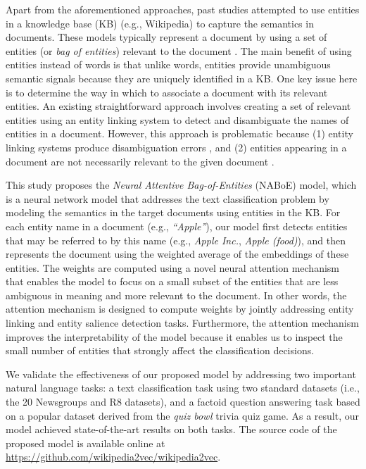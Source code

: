 \documentclass[11pt,a4paper]{article}
\begin{document}
    Apart from the aforementioned approaches, past studies attempted to use entities in a knowledge base (KB) (e.g., Wikipedia) to capture the semantics in documents.
    These models typically represent a document by using a set of entities (or \textit{bag of entities}) relevant to the document \cite{Gabrilovich2006,Gabrilovich2007,Xiong2016}.
    The main benefit of using entities instead of words is that unlike words, entities provide unambiguous semantic signals because they are uniquely identified in a KB.
    One key issue here is to determine the way in which to associate a document with its relevant entities.
    An existing straightforward approach \cite{peng-liu-lin:2016:P16-1,Xiong2016} involves creating a set of relevant entities using an entity linking system to detect and disambiguate the names of entities in a document.
    However, this approach is problematic because
    (1) entity linking systems produce disambiguation errors \cite{Cornolti:2013:FBE:2488388.2488411}, and
    (2) entities appearing in a document are not necessarily relevant to the given document \cite{Gamon2013,dunietz-gillick:2014:EACL2014-SP}.

    This study proposes the \textit{Neural Attentive Bag-of-Entities} (NABoE) model, which is a neural network model that addresses the text classification problem by modeling the semantics in the target documents using entities in the KB.
    For each entity name in a document (e.g., \textit{``Apple''}), our model first detects entities that may be referred to by this name (e.g., \textit{Apple Inc.}, \textit{Apple (food)}), and then represents the document using the weighted average of the embeddings of these entities.
    The weights are computed using a novel neural attention mechanism that enables the model to focus on a small subset of the entities that are less ambiguous in meaning and more relevant to the document.
    In other words, the attention mechanism is designed to compute weights by jointly addressing entity linking and entity salience detection \cite{Gamon2013,dunietz-gillick:2014:EACL2014-SP} tasks.
    Furthermore, the attention mechanism improves the interpretability of the model because it enables us to inspect the small number of entities that strongly affect the classification decisions.

    We validate the effectiveness of our proposed model by addressing two important natural language tasks: a text classification task using two standard datasets (i.e., the 20 Newsgroups and R8 datasets), and a factoid question answering task based on a popular dataset derived from the \textit{quiz bowl} trivia quiz game.
    As a result, our model achieved state-of-the-art results on both tasks.
    The source code of the proposed model is available online at \url{https://github.com/wikipedia2vec/wikipedia2vec}.
\end{document}
